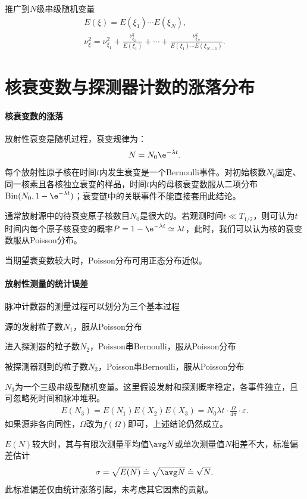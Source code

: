 推广到$N$级串级随机变量
\begin{gather*}
	E(\xi)=E(\xi_1)\cdots E(\xi_N),\\
	\nu_\xi^2=\nu_{\xi_1}^2+\frac{\nu_{\xi_2}^2}{E(\xi_1)}+\cdots+\frac{\nu_{\xi_N}^2}{E(\xi_1)\cdots E(\xi_{N-1})}.
\end{gather*}

\section{核衰变数与探测器计数的涨落分布}

\paragraph{核衰变数的涨落}
放射性衰变是随机过程，衰变规律为：
\[
	N=N_0\e^{-\lambda t}.
\]
每个放射性原子核在时间$t$内发生衰变是一个Bernoulli事件。对初始核数$N_0$固定、同一核素且各核独立衰变的样品，时间$t$内的母核衰变数服从二项分布$\operatorname{Bin}(N_0,1-\e^{-\lambda t})$；衰变链中的关联事件不能直接套用此结论。

通常放射源中的待衰变原子核数目$N_0$是很大的。若观测时间$t\ll T_{1/2}$，则可认为$t$时间内每个原子核衰变的概率$P=1-\e^{-\lambda t}\simeq\lambda t$，此时，我们可以认为核的衰变数服从Poisson分布。

当期望衰变数较大时，Poisson分布可用正态分布近似。
\paragraph{放射性测量的统计误差}
脉冲计数器的测量过程可以划分为三个基本过程
\begin{compactitem}
	\item 源的发射粒子数$N_1$，服从Poisson分布
	\item 进入探测器的粒子数$N_2$，Poisson串Bernoulli，服从Poisson分布
	\item 被探测器测到的粒子数$N_3$，Poisson串Bernoulli，服从Poisson分布
\end{compactitem}
$N_3$为一个三级串级型随机变量。这里假设发射和探测概率稳定，各事件独立，且可忽略死时间和脉冲堆积。
\begin{align}\label{detector-expect}
	E(N_3)=E(N_1)E(X_2)E(X_3)=N_0\lambda t\cdot\frac{\Omega}{4\pi}\cdot\varepsilon.
\end{align}
如果源非各向同性，$\Omega$改为$f(\Omega)$即可，上述结论仍然成立。%

$E(N)$较大时，其与有限次测量平均值$\avg N$或单次测量值$N$相差不大，标准偏差估计
\[
	\sigma=\sqrt{E(N)}\doteq\sqrt{\avg N}\doteq\sqrt N.
\]
此标准偏差仅由统计涨落引起，未考虑其它因素的贡献。

